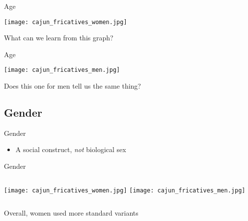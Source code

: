 \documentclass{beamer}
\newcommand{\subonethree}{Age}
\newcommand{\subonefour}{Gender}
\begin{document}
      \begin{frame}{\subonethree}
        \begin{center}
          \texttt{[image: cajun\_fricatives\_women.jpg]}
        \end{center}
        \begin{block}{}
          What can we learn from this graph?
        \end{block}
      \end{frame}

      \begin{frame}{\subonethree}
        \begin{center}
          \texttt{[image: cajun\_fricatives\_men.jpg]}
        \end{center}
        \begin{block}{}
          Does this one for men tell us the same thing?
        \end{block}
      \end{frame}

    \subsection{\subonefour}
      \begin{frame}{\subonefour}
        \begin{definition}
          
          \begin{itemize}
            \item A social construct, \emph{not} biological sex
          \end{itemize}
        \end{definition}
      \end{frame}

      \begin{frame}{\subonefour}
        \begin{columns}
            \texttt{[image: cajun\_fricatives\_women.jpg]}
            \texttt{[image: cajun\_fricatives\_men.jpg]}
        \end{columns}
        \begin{block}{}
          Overall, women used more standard variants
        \end{block}
      \end{frame}
\end{document}
